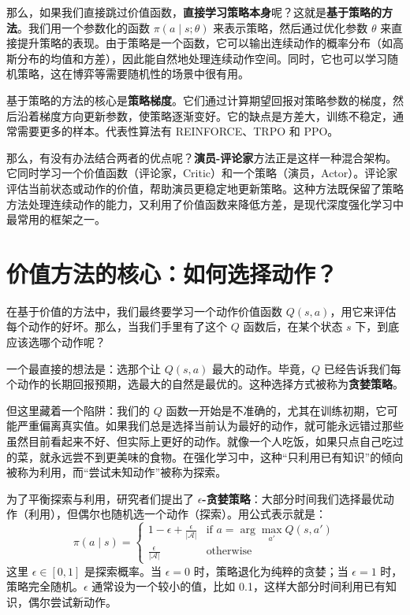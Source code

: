 \documentclass[lang=cn,zihao=-4,a4paper,fontset=windows]{beautybook}
\begin{document}
那么，如果我们直接跳过价值函数，\textbf{直接学习策略本身}呢？这就是\textbf{基于策略的方法}。我们用一个参数化的函数 \(\pi(a \mid s; \theta)\) 来表示策略，然后通过优化参数 \(\theta\) 来直接提升策略的表现。由于策略是一个函数，它可以输出连续动作的概率分布（如高斯分布的均值和方差），因此能自然地处理连续动作空间。同时，它也可以学习随机策略，这在博弈等需要随机性的场景中很有用。

基于策略的方法的核心是\textbf{策略梯度}。它们通过计算期望回报对策略参数的梯度，然后沿着梯度方向更新参数，使策略逐渐变好。它的缺点是方差大，训练不稳定，通常需要更多的样本。代表性算法有 REINFORCE、TRPO 和 PPO。

那么，有没有办法结合两者的优点呢？\textbf{演员-评论家}方法正是这样一种混合架构。它同时学习一个价值函数（评论家，Critic）和一个策略（演员，Actor）。评论家评估当前状态或动作的价值，帮助演员更稳定地更新策略。这种方法既保留了策略方法处理连续动作的能力，又利用了价值函数来降低方差，是现代深度强化学习中最常用的框架之一。

\section{价值方法的核心：如何选择动作？}

在基于价值的方法中，我们最终要学习一个动作价值函数 \(Q(s,a)\)，用它来评估每个动作的好坏。那么，当我们手里有了这个 \(Q\) 函数后，在某个状态 \(s\) 下，到底应该选哪个动作呢？

一个最直接的想法是：选那个让 \(Q(s,a)\) 最大的动作。毕竟，\(Q\) 已经告诉我们每个动作的长期回报预期，选最大的自然是最优的。这种选择方式被称为\textbf{贪婪策略}。

但这里藏着一个陷阱：我们的 \(Q\) 函数一开始是不准确的，尤其在训练初期，它可能严重偏离真实值。如果我们总是选择当前认为最好的动作，就可能永远错过那些虽然目前看起来不好、但实际上更好的动作。就像一个人吃饭，如果只点自己吃过的菜，就永远尝不到更美味的食物。在强化学习中，这种“只利用已有知识”的倾向被称为利用，而“尝试未知动作”被称为探索。

为了平衡探索与利用，研究者们提出了 \textbf{\(\epsilon\)-贪婪策略}：大部分时间我们选择最优动作（利用），但偶尔也随机选一个动作（探索）。用公式表示就是：
\[
\pi(a \mid s) = 
\begin{cases}
1 - \epsilon + \frac{\epsilon}{|\mathcal{A}|} & \text{if } a = \arg\max_{a'} Q(s, a') \\
\frac{\epsilon}{|\mathcal{A}|} & \text{otherwise}
\end{cases}
\]
这里 \(\epsilon \in [0,1]\) 是探索概率。当 \(\epsilon=0\) 时，策略退化为纯粹的贪婪；当 \(\epsilon=1\) 时，策略完全随机。\(\epsilon\) 通常设为一个较小的值，比如 0.1，这样大部分时间利用已有知识，偶尔尝试新动作。
\end{document}
